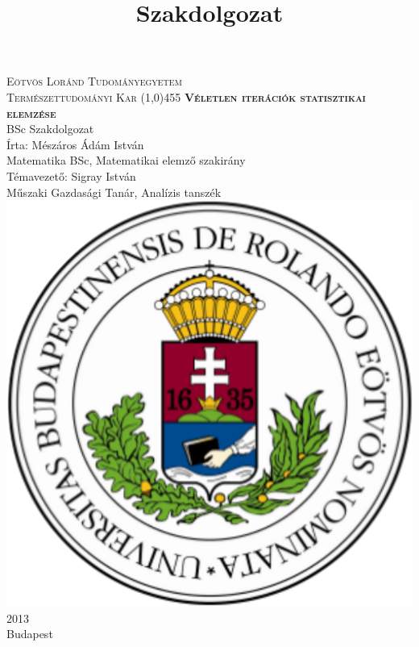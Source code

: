 \documentclass[a4paper,12pt]{report}
\title{Szakdolgozat}
\newcommand{\noun}[1]{\textsc{#1}}
\begin{document}



	\thispagestyle{empty}
	\begin{center}
		{\large \noun{Eötvös Loránd Tudományegyetem \\ Természettudományi Kar} }
		\line(1,0){455}
		\vspace{80pt}
		{\Huge \noun{\textbf{Véletlen iterációk statisztikai elemzése}}}
		\vspace{20pt}
		\\BSc Szakdolgozat
		\vspace{90pt}
		\\Írta: Mészáros Ádám István\\ Matematika BSc, Matematikai elemző szakirány\\
		\vspace{35pt}
		Témavezető: Sigray István\\ Műszaki Gazdasági Tanár, Analízis tanszék\\
		\vspace{100pt}
		\includegraphics[scale=0.21]{elte.png}
		\vspace{25pt}
		\\ 2013\\ Budapest
	\end{center}
	\tableofcontents
	\setcounter{page}{1}
\end{document}
